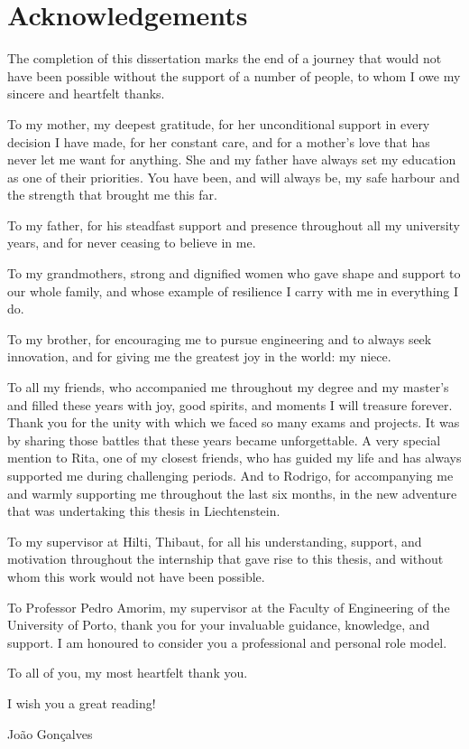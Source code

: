 \chapter*{Acknowledgements}

The completion of this dissertation marks the end of a journey that would not have been possible without the support of a number of people, to whom I owe my sincere and heartfelt thanks.

To my mother, my deepest gratitude, for her unconditional support in every decision I have made, for her constant care, and for a mother's love that has never let me want for anything. She and my father have always set my education as one of their priorities. You have been, and will always be, my safe harbour and the strength that brought me this far.

To my father, for his steadfast support and presence throughout all my university years, and for never ceasing to believe in me.

To my grandmothers, strong and dignified women who gave shape and support to our whole family, and whose example of resilience I carry with me in everything I do.

To my brother, for encouraging me to pursue engineering and to always seek innovation, and for giving me the greatest joy in the world: my niece.

To all my friends, who accompanied me throughout my degree and my master's and filled these years with joy, good spirits, and moments I will treasure forever. Thank you for the unity with which we faced so many exams and projects. It was by sharing those battles that these years became unforgettable. A very special mention to Rita, one of my closest friends, who has guided my life and has always supported me during challenging periods. And to Rodrigo, for accompanying me and warmly supporting me throughout the last six months, in the new adventure that was undertaking this thesis in Liechtenstein.

To my supervisor at Hilti, Thibaut, for all his understanding, support, and motivation throughout the internship that gave rise to this thesis, and without whom this work would not have been possible.

To Professor Pedro Amorim, my supervisor at the Faculty of Engineering of the University of Porto, thank you for your invaluable guidance, knowledge, and support. I am honoured to consider you a professional and personal role model.

To all of you, my most heartfelt thank you.

I wish you a great reading!

\begin{flushright}
João Gonçalves
\end{flushright}
